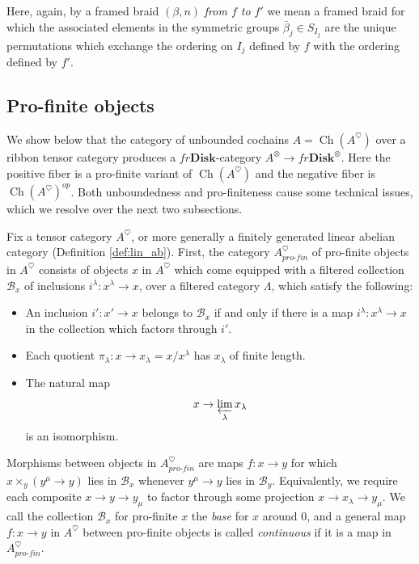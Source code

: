 \documentclass[reqno]{amsart}
\theoremstyle{definition}
\newcommand{\mcl}[1]{\mathcal{#1}}
\newcommand{\opn}[1]{\operatorname{#1}}
\newcommand{\ot}{\otimes}
\newcommand{\Disk}{\mathbf{Disk}}
\newcommand{\pf}{pro\text{-}fin}
\renewcommand{\1}{\mathbf{1}}
\begin{document}
Here, again, by a framed braid $(\beta,n)$ \emph{from $f$ to $f'$} we mean a framed braid for which the associated elements in the symmetric groups $\bar{\beta}_j\in S_{I_j}$ are the unique permutations which exchange the ordering on $I_j$ defined by $f$ with the ordering defined by $f'$.

\subsection{Pro-finite objects}
\label{sect:pf_obj}

We show below that the category of unbounded cochains $A=\opn{Ch}(A^{\heartsuit})$ over a ribbon tensor category produces a $fr\Disk$-category $A^{\ot}\to fr\Disk^{\ot}$.  Here the positive fiber is a pro-finite variant of $\opn{Ch}(A^{\heartsuit})$ and the negative fiber is $\opn{Ch}(A^{\heartsuit})^{op}$.  Both unboundedness and pro-finiteness cause some technical issues, which we resolve over the next two subsections.
\par

Fix a tensor category $A^{\heartsuit}$, or more generally a finitely generated linear abelian category (Definition \ref{def:lin_ab}). First, the category $A^{\heartsuit}_{\pf}$ of pro-finite objects in $A^{\heartsuit}$ consists of objects $x$ in $A^{\heartsuit}$ which come equipped with a filtered collection $\mcl{B}_x$ of inclusions $i^{\lambda}:x^{\lambda}\to x$, over a filtered category $\Lambda$, which satisfy the following:
\begin{itemize}
\item An inclusion $i':x'\to x$ belongs to $\mcl{B}_x$ if and only if there is a map $i^{\lambda}:x^{\lambda}\to x$ in the collection which factors through $i'$.\vspace{1mm}
\item Each quotient $\pi_{\lambda}:x\to x_{\lambda}=x/x^{\lambda}$ has $x_{\lambda}$ of finite length.\vspace{1mm}
\item The natural map
\begin{equation}\label{eq:can_lim}
x\to \varprojlim_\lambda x_{\lambda}
\end{equation}
is an isomorphism.\vspace{1mm}
\end{itemize}
Morphisms between objects in $A^{\heartsuit}_{\pf}$ are maps $f:x\to y$ for which $x\times_y(y^{\mu}\to y)$ lies in $\mcl{B}_x$ whenever $y^{\mu}\to y$ lies in $\mcl{B}_y$.  Equivalently, we require each composite $x\to y\to y_{\mu}$ to factor through some projection $x\to x_{\lambda}\to y_\mu$.  We call the collection $\mcl{B}_x$ for pro-finite $x$ the \emph{base} for $x$ around $0$, and a general map $f:x\to y$ in $A^{\heartsuit}$ between pro-finite objects is called \emph{continuous} if it is a map in $A^{\heartsuit}_{\pf}$.
\end{document}
